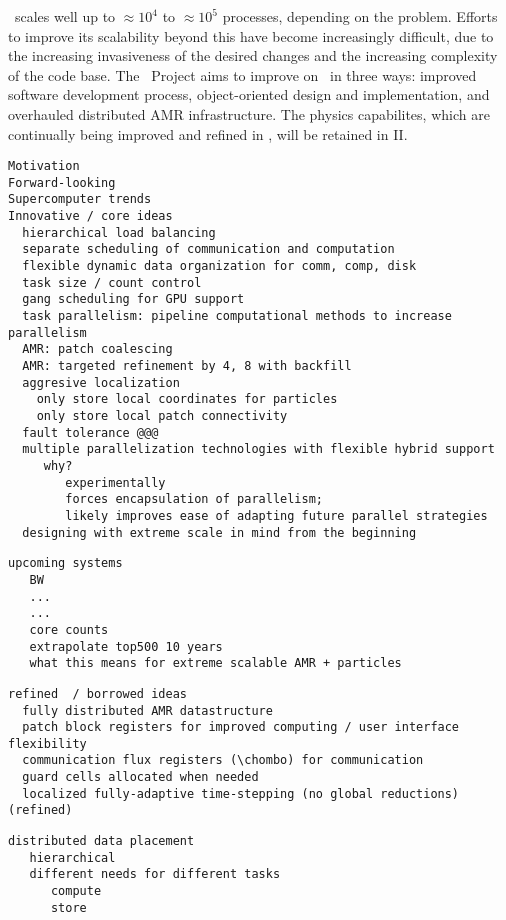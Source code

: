 \documentclass{article}
\begin{document}
\enzo\ scales well up to $\approx 10^4$ to $\approx 10^5$ processes,
depending on the problem.  Efforts to improve its scalability beyond
this have become increasingly difficult, due to the increasing
invasiveness of the desired changes and the increasing complexity of
the code base.  The \cello\ Project aims to improve on \enzo\ in three
ways: improved software development process, object-oriented design
and implementation, and overhauled distributed AMR infrastructure.
The physics capabilites, which are continually being improved and
refined in \enzo, will be retained in \enzo II.

\begin{verbatim}
Motivation
Forward-looking
Supercomputer trends
Innovative / core ideas
  hierarchical load balancing
  separate scheduling of communication and computation
  flexible dynamic data organization for comm, comp, disk
  task size / count control
  gang scheduling for GPU support
  task parallelism: pipeline computational methods to increase parallelism
  AMR: patch coalescing
  AMR: targeted refinement by 4, 8 with backfill
  aggresive localization
    only store local coordinates for particles
    only store local patch connectivity
  fault tolerance @@@
  multiple parallelization technologies with flexible hybrid support
     why?  
        experimentally 
        forces encapsulation of parallelism; 
        likely improves ease of adapting future parallel strategies
  designing with extreme scale in mind from the beginning
\end{verbatim}

\begin{verbatim}
upcoming systems
   BW
   ...
   ...
   core counts
   extrapolate top500 10 years
   what this means for extreme scalable AMR + particles
\end{verbatim}

\begin{verbatim}
refined  / borrowed ideas
  fully distributed AMR datastructure
  patch block registers for improved computing / user interface flexibility
  communication flux registers (\chombo) for communication
  guard cells allocated when needed
  localized fully-adaptive time-stepping (no global reductions) (refined)
\end{verbatim}



\begin{verbatim}
distributed data placement
   hierarchical
   different needs for different tasks
      compute
      store
\end{verbatim}
\end{document}
